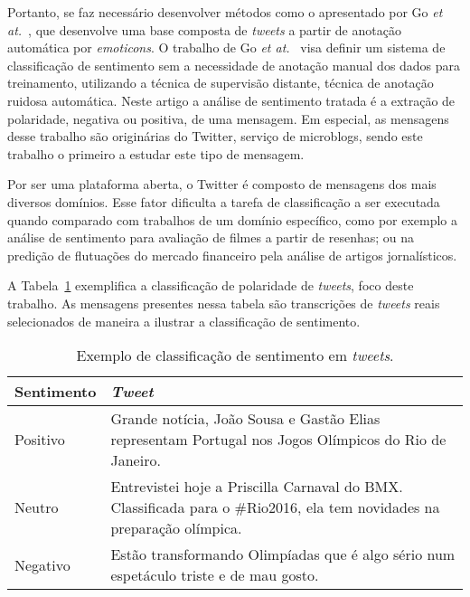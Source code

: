 Portanto, se faz necessário desenvolver métodos como o apresentado por Go \textit{et at.}~\cite{go09}, que desenvolve
uma base composta de \textit{tweets} a partir de anotação automática por \textit{emoticons}.
O trabalho de Go \textit{et at.}~\cite{go09} visa definir um sistema de classificação de sentimento sem a necessidade de
anotação manual dos dados para treinamento, utilizando a técnica de supervisão distante, técnica de anotação ruidosa
automática.
Neste artigo a análise de sentimento tratada é a extração de polaridade, negativa ou positiva, de uma mensagem.
Em especial, as mensagens desse trabalho são originárias do Twitter, serviço de microblogs, sendo este trabalho o
primeiro a estudar este tipo de mensagem.

Por ser uma plataforma aberta, o Twitter é composto de mensagens dos mais diversos domínios.
Esse fator dificulta a tarefa de classificação a ser executada quando comparado com trabalhos de um domínio específico,
como por exemplo a análise de sentimento para avaliação de filmes a partir de resenhas; ou na predição de flutuações do
mercado financeiro pela análise de artigos jornalísticos.

A Tabela~\ref{tab:sentiment} exemplifica a classificação de polaridade de \textit{tweets}, foco deste trabalho.
As mensagens presentes nessa tabela são transcrições de \textit{tweets} reais selecionados de maneira a ilustrar
a classificação de sentimento.

\begin{table}[h]
    \begin{center}
        \begin{tabular}{| l | p{10cm} |}
        \hline
        \textbf{Sentimento} & \textbf{\textit{Tweet}} \\ \hline
        Positivo & Grande notícia, João Sousa e Gastão Elias representam Portugal nos Jogos Olímpicos do Rio de Janeiro.
        \\ \hline
        Neutro & Entrevistei hoje a Priscilla Carnaval do BMX. Classificada para o \#Rio2016, ela tem novidades na
        preparação olímpica. \\ \hline
        Negativo & Estão transformando Olimpíadas que é algo sério num espetáculo triste e de mau gosto. \\ \hline
        \end{tabular}
        \caption{Exemplo de classificação de sentimento em \textit{tweets}.}
        \label{tab:sentiment}
    \end{center}
\end{table}

